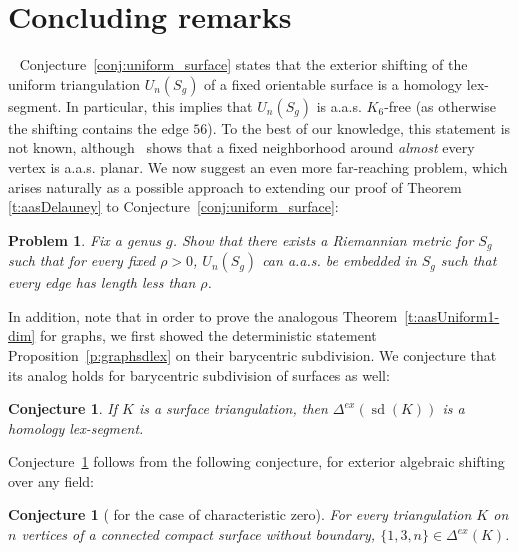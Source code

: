 \documentclass[11pt]{article}
\newtheorem{problem}[theorem]{Problem}
\newtheorem{conjecture}[theorem]{Conjecture}
\numberwithin{claimcounter}{theorem}
\theoremstyle{remark}
\theoremstyle{definition}
\numberwithin{theorem}{section}
\DeclareMathOperator{\sd}{sd}
\newcommand{\exshift}[1]{\Delta^{ex}(#1)}
\begin{document}
\section{Concluding remarks}~\label{sec:Conclude}
Conjecture~\ref{conj:uniform_surface} states that the exterior shifting of the uniform triangulation $U_n(S_g)$ of a fixed orientable surface is a homology lex-segment. In particular, this implies that  $U_n(S_g)$ is a.a.s. $K_6$-free (as otherwise the shifting contains the edge $56$). 
To the best of our knowledge, this statement is not known, although~\cite{budzinski2022multi} shows that a fixed neighborhood around \textit{almost} every vertex is a.a.s. planar. We now suggest an even more far-reaching problem, which arises naturally as a possible approach to extending our proof of Theorem \ref{t:aasDelauney} to Conjecture~\ref{conj:uniform_surface}:
%
\begin{problem}
    Fix a genus $g$. Show that there exists a Riemannian metric for $S_g$ such that for every fixed $\rho>0$, $U_n(S_g)$ can a.a.s. be embedded in $S_g$  such that every edge has length less than $\rho$. 
\end{problem}
%
%
In addition, note that in order to prove the analogous Theorem~\ref{t:aasUniform1-dim} for graphs, we first showed the deterministic statement Proposition~\ref{p:graphsdlex} on their barycentric subdivision. We conjecture that its analog holds for barycentric subdivision of surfaces as well:   
\begin{conjecture}\label{conj:br(surface)}
    If $K$ is a surface triangulation, then $\exshift{\sd(K)}$ is a homology lex-segment.
\end{conjecture}
Conjecture~\ref{conj:br(surface)} follows from the following conjecture, for exterior algebraic shifting over any field:
\begin{conjecture}
[{\cite[Conj.5.1]{bulavka23-rigidity}} for the case of characteristic zero]
\label{conj:area-rig}
For every triangulation $K$ on $n$ vertices of a connected compact surface without boundary, 
$\{1,3,n\} \in \exshift{K}$. 
\end{conjecture}
\end{document}
